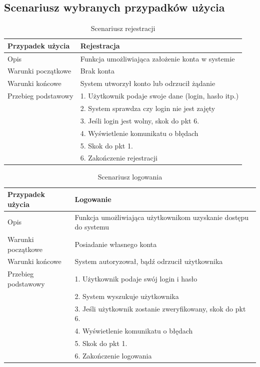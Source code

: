 \subsection{Scenariusz wybranych przypadków użycia}

\begin{table}[H]
	\begin{tabularx}{\textwidth}{ |l|X| }
		\hline 
		Przypadek użycia & Rejestracja  \\ 
		\hline 
		Opis & Funkcja umożliwiająca założenie konta w systemie \\ 
		\hline 
		Warunki początkowe & Brak konta \\ 
		\hline 
		Warunki końcowe & System utworzył konto lub odrzucił żądanie  \\ 
		\hline 
		Przebieg podstawowy & 1. Użytkownik podaje swoje dane (login, hasło itp.) \\ 
		& 2. System sprawdza czy login nie jest zajęty \\
		& 3. Jeśli login jest wolny, skok do pkt 6. \\
		& 4. Wyświetlenie komunikatu o błędach \\
		& 5. Skok do pkt 1. \\
		& 6. Zakończenie rejestracji \\
		\hline 
	\end{tabularx} 
    \caption{Scenariusz rejestracji}
\label{tab:scen1}   
\end{table}

\begin{table}[H]
	\begin{tabularx}{\textwidth}{ |l|X| }
		\hline 
		Przypadek użycia & Logowanie  \\ 
		\hline 
		Opis & Funkcja umożliwiająca użytkownikom uzyskanie dostępu do systemu \\ 
		\hline 
		Warunki początkowe & Posiadanie własnego konta \\ 
		\hline 
		Warunki końcowe & System autoryzował, bądź odrzucił użytkownika  \\ 
		\hline 
		Przebieg podstawowy & 1. Użytkownik podaje swój login i hasło \\ 
		& 2. System wyszukuje użytkownika \\
		& 3. Jeśli użytkownik zostanie zweryfikowany, skok do pkt 6. \\
		& 4. Wyświetlenie komunikatu o błędach \\
		& 5. Skok do pkt 1. \\
		& 6. Zakończenie logowania \\
		\hline 
	\end{tabularx} 
	\caption{Scenariusz logowania}
	\label{tab:scen2}   
\end{table}

